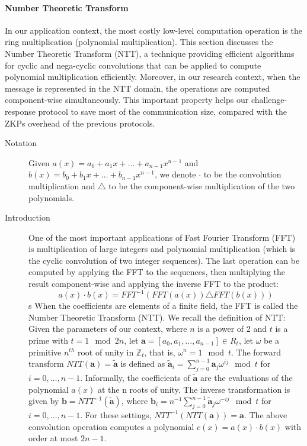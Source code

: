 \paragraph{Number Theoretic Transform}
In our application context, the most costly low-level computation operation is
the ring multiplication (polynomial multiplication). This section discusses the
Number Theoretic Transform (NTT), a technique providing efficient algorithms
for cyclic and nega-cyclic convolutions that can be applied to compute
polynomial multiplication efficiently. Moreover, in our research context, when
the message is represented in the NTT domain, the operations are computed
component-wise simultaneously. This important property helps our
challenge-response protocol to save most of the communication size, compared with the
ZKPs overhead of the previous protocols.
\begin{description}
\item[Notation] Given \(a(x) = a_{0} + a_{1}x + \dots + a_{n-1}x^{n-1}\) and
  \(b(x) = b_{0} + b_{1}x + \dots + b_{n-1}x^{n-1}\), we denote \(\cdot\) to be
  the convolution multiplication and \(\triangle\) to be the component-wise
  multiplication of the two polynomials.
\item[Introduction] One of the most important applications of Fast Fourier
  Transform (FFT) is multiplication of large integers and polynomial
  multiplication (which is the cyclic convolution of two integer sequences). The
  last operation can be computed by applying the FFT to the sequences, then
  multiplying the result component-wise and applying the inverse FFT to the
  product:
  \[
    a(x)\cdot b(x) = FFT^{-1}(FFT(a(x)) \triangle FFT(b(x)))
  \]
s  When the coefficients are elements of a finite field, the FFT is called the
  Number Theoretic Transform (NTT). We recall the definition of NTT: Given the
  parameters of our context, where \(n\) is a power of 2 and \(t\) is a prime
  with \(t = 1 \mod 2n\), let
  \(\mathbf{a} = [a_{0}, a_{1}, \dots, a_{n-1}] \in R_{t}\), let \(\omega\)
  be a primitive \(n^{th}\) root of unity in \(\mathbb{Z}_{t}\), that is,
  \(\omega^{n} = 1 \mod t\). The forward transform
  \(NTT(\mathbf{a}) = \tilde{\mathbf{a}}\) is defined as
  \(\tilde{\mathbf{a}}_{i} = \sum_{j=0}^{n-1}{\mathbf{a}_{j}}\omega^{ij} \mod
  t\) for \(i = 0, \dots, n -1\). Informally, the coefficients of
  \(\tilde{\mathbf{a}}\) are the evaluations of the polynomial \(a(x)\) at the n
  roots of unity. The inverse transformation is given by
  \(\mathbf{b} = NTT^{-1}(\tilde{\mathbf{a}})\), where
  \(\mathbf{b}_{i} = n^{-1}\sum_{j=0}^{n-1}\tilde{\mathbf{a}}_{j}\omega^{-ij}
  \mod t \) for \(i = 0, \dots, n - 1\). For these settings,
  \(NTT^{-1}(NTT(\mathbf{a})) = \mathbf{a}\).  The above convolution operation
  computes a polynomial \(c(x) = a(x)\cdot b(x)\) with order at most \(2n - 1\).
  

\end{description}
